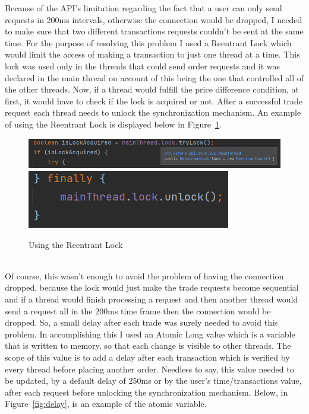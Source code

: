 \documentclass[12pt,a4paper]{report}
\begin{document}
Because of the API's limitation regarding the fact that a user can only send requests in 200ms intervals, otherwise the connection would be dropped, I needed to make sure that two different transactions requests couldn't be sent at the same time. For the purpose of resolving this problem I used a Reentrant Lock which would limit the access of making a transaction to just one thread at a time. This lock was used only in the threads that could send order requests and it was declared in the main thread on account of this being the one that controlled all of the other threads. Now, if a thread would fulfill the price difference condition, at first, it would have to check if the lock is acquired or not. After a successful trade request each thread needs to unlock the synchronization mechanism.
\newpage
An example of using the Reentrant Lock is displayed below in Figure~\ref{fig:lock}.
\begin{figure}[!ht]
	\centering
	\includegraphics[scale=0.7]{pics/lock1.png}
	\includegraphics[scale=0.7]{pics/lock2.png}
	\caption{Using the Reentrant Lock}
	\label{fig:lock}
\end{figure}
\\
Of course, this wasn't enough to avoid the problem of having the connection dropped, because the lock would just make the trade requests become sequential and if a thread would finish processing a request and then another thread would send a request all in the 200ms time frame then the connection would be dropped. So, a small delay after each trade was surely needed to avoid this problem. In accomplishing this I used an Atomic Long value which is a variable that is written to memory, so that each change is visible to other threads. The scope of this value is to add a delay after each transaction which is verified by every thread before placing another order. Needless to say, this value needed to be updated, by a default delay of 250ms or by the user's time/transactions value, after each request before unlocking the synchronization mechanism.
Below, in Figure~\ref{fig:delay}, is an example of the atomic variable.
\end{document}
